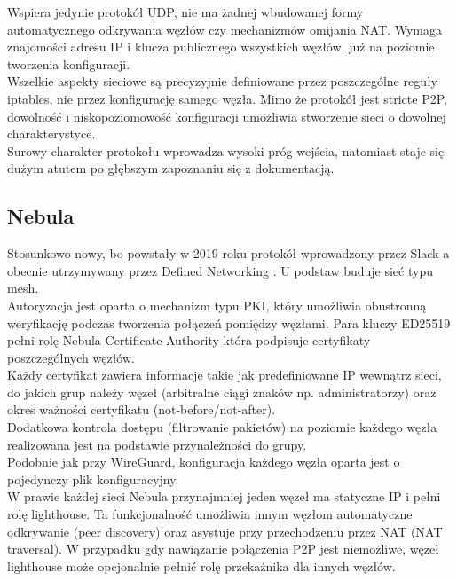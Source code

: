 Wspiera jedynie protokół UDP, nie ma żadnej wbudowanej formy automatycznego odkrywania węzłów czy mechanizmów omijania NAT. Wymaga znajomości adresu IP i klucza publicznego wszystkich węzłów, już na poziomie tworzenia konfiguracji.\\

Wszelkie aspekty sieciowe są precyzyjnie definiowane przez poszczególne reguły iptables, nie przez konfigurację samego węzła. Mimo że protokół jest stricte P2P, dowolność i niskopoziomowość konfiguracji umożliwia stworzenie sieci o dowolnej charakterystyce.\\

Surowy charakter protokołu wprowadza wysoki próg wejścia, natomiast staje się dużym atutem po głębszym zapoznaniu się z dokumentacją.\\

\newpage
\subsection{Nebula}

Stosunkowo nowy, bo powstały w 2019 roku protokół wprowadzony przez Slack \cite{OEWV} a obecnie utrzymywany przez Defined Networking \cite{N7BM}. U podstaw buduje sieć typu mesh.\\

Autoryzacja jest oparta o mechanizm typu PKI, który umożliwia obustronną weryfikację podczas tworzenia połączeń pomiędzy węzłami. Para kluczy ED25519 pełni rolę Nebula Certificate Authority która podpisuje certyfikaty poszczególnych węzłów.\\

Każdy certyfikat zawiera informacje takie jak predefiniowane IP wewnątrz sieci, do jakich grup należy węzeł (arbitralne ciągi znaków np. administratorzy) oraz okres ważności certyfikatu (not-before/not-after).\\

Dodatkowa kontrola dostępu (filtrowanie pakietów) na poziomie każdego węzła realizowana jest na podstawie przynależności do grupy.\\

Podobnie jak przy WireGuard, konfiguracja każdego węzła oparta jest o pojedynczy plik konfiguracyjny.\\

W prawie każdej sieci Nebula przynajmniej jeden węzeł ma statyczne IP i pełni rolę lighthouse. Ta funkcjonalność umożliwia innym węzłom automatyczne odkrywanie (peer discovery) oraz asystuje przy przechodzeniu przez NAT (NAT traversal). W przypadku gdy nawiązanie połączenia P2P jest niemożliwe, węzeł lighthouse może opcjonalnie pełnić rolę przekaźnika dla innych węzłów.\\

